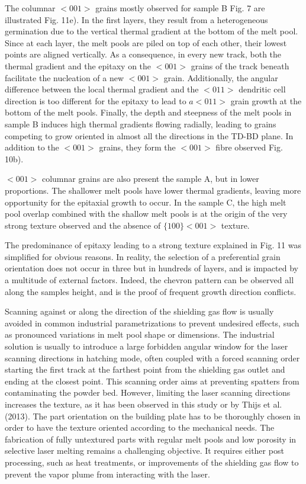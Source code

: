 \documentclass[10pt]{article}
\begin{document}
The columnar $<001>$ grains mostly observed for sample B Fig. 7 are illustrated Fig. 11e). In the first layers, they result from a heterogeneous germination due to the vertical thermal gradient at the bottom of the melt pool. Since at each layer, the melt pools are piled on top of each other, their lowest points are aligned vertically. As a consequence, in every new track, both the thermal gradient and the epitaxy on the $<001>$ grains of the track beneath facilitate the nucleation of a new $<001>$ grain. Additionally, the angular difference between the local thermal gradient and the $<011>$ dendritic cell direction is too different for the epitaxy to lead to $a<011>$ grain growth at the bottom of the melt pools. Finally, the depth and steepness of the melt pools in sample B induces high thermal gradients flowing radially, leading to grains competing to grow oriented in almost all the directions in the TD-BD plane. In addition to the $<001>$ grains, they form the $<001>$ fibre observed Fig. 10b).

$<001>$ columnar grains are also present the sample A, but in lower proportions. The shallower melt pools have lower thermal gradients, leaving more opportunity for the epitaxial growth to occur. In the sample $\mathrm{C}$, the high melt pool overlap combined with the shallow melt pools is at the origin of the very strong texture observed and the absence of $\{100\}<001>$ texture.

The predominance of epitaxy leading to a strong texture explained in Fig. 11 was simplified for obvious reasons. In reality, the selection of a preferential grain orientation does not occur in three but in hundreds of layers, and is impacted by a multitude of external factors. Indeed, the chevron pattern can be observed all along the samples height, and is the proof of frequent growth direction conflicts.

Scanning against or along the direction of the shielding gas flow is usually avoided in common industrial parametrizations to prevent undesired effects, such as pronounced variations in melt pool shape or dimensions. The industrial solution is usually to introduce a large forbidden angular window for the laser scanning directions in hatching mode, often coupled with a forced scanning order starting the first track at the farthest point from the shielding gas outlet and ending at the closest point. This scanning order aims at preventing spatters from contaminating the powder bed. However, limiting the laser scanning directions increases the texture, as it has been observed in this study or by Thijs et al. (2013). The part orientation on the building plate has to be thoroughly chosen in order to have the texture oriented according to the mechanical needs. The fabrication of fully untextured parts with regular melt pools and low porosity in selective laser melting remains a challenging objective. It requires either post processing, such as heat treatments, or improvements of the shielding gas flow to prevent the vapor plume from interacting with the laser.
\end{document}
